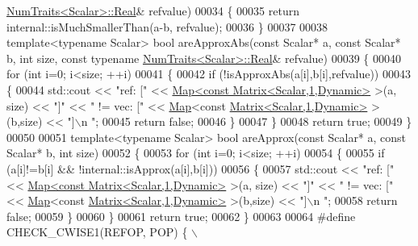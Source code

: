 \begin{DoxyCode}
      \hyperlink{group___core___module_struct_eigen_1_1_num_traits}{NumTraits<Scalar>::Real}& refvalue)
00034 \{
00035   \textcolor{keywordflow}{return} internal::isMuchSmallerThan(a-b, refvalue);
00036 \}
00037 
00038 \textcolor{keyword}{template}<\textcolor{keyword}{typename} Scalar> \textcolor{keywordtype}{bool} areApproxAbs(\textcolor{keyword}{const} Scalar* a, \textcolor{keyword}{const} Scalar* b, \textcolor{keywordtype}{int} size, \textcolor{keyword}{const} \textcolor{keyword}{typename} 
      \hyperlink{group___core___module_struct_eigen_1_1_num_traits}{NumTraits<Scalar>::Real}& refvalue)
00039 \{
00040   \textcolor{keywordflow}{for} (\textcolor{keywordtype}{int} i=0; i<size; ++i)
00041   \{
00042     \textcolor{keywordflow}{if} (!isApproxAbs(a[i],b[i],refvalue))
00043     \{
00044       std::cout << \textcolor{stringliteral}{"ref: ["} << \hyperlink{group___core___module_class_eigen_1_1_map}{Map<const Matrix<Scalar,1,Dynamic>} >(a,
      size) << \textcolor{stringliteral}{"]"} << \textcolor{stringliteral}{" != vec: ["} << \hyperlink{group___core___module_class_eigen_1_1_map}{Map}<\textcolor{keyword}{const} \hyperlink{group___core___module_class_eigen_1_1_matrix}{Matrix<Scalar,1,Dynamic>} >(b,size) << \textcolor{stringliteral}{"]\(\backslash\)n
      "};
00045       \textcolor{keywordflow}{return} \textcolor{keyword}{false};
00046     \}
00047   \}
00048   \textcolor{keywordflow}{return} \textcolor{keyword}{true};
00049 \}
00050 
00051 \textcolor{keyword}{template}<\textcolor{keyword}{typename} Scalar> \textcolor{keywordtype}{bool} areApprox(\textcolor{keyword}{const} Scalar* a, \textcolor{keyword}{const} Scalar* b, \textcolor{keywordtype}{int} size)
00052 \{
00053   \textcolor{keywordflow}{for} (\textcolor{keywordtype}{int} i=0; i<size; ++i)
00054   \{
00055     \textcolor{keywordflow}{if} (a[i]!=b[i] && !internal::isApprox(a[i],b[i]))
00056     \{
00057       std::cout << \textcolor{stringliteral}{"ref: ["} << \hyperlink{group___core___module_class_eigen_1_1_map}{Map<const Matrix<Scalar,1,Dynamic>} >(a,
      size) << \textcolor{stringliteral}{"]"} << \textcolor{stringliteral}{" != vec: ["} << \hyperlink{group___core___module_class_eigen_1_1_map}{Map}<\textcolor{keyword}{const} \hyperlink{group___core___module_class_eigen_1_1_matrix}{Matrix<Scalar,1,Dynamic>} >(b,size) << \textcolor{stringliteral}{"]\(\backslash\)n
      "};
00058       \textcolor{keywordflow}{return} \textcolor{keyword}{false};
00059     \}
00060   \}
00061   \textcolor{keywordflow}{return} \textcolor{keyword}{true};
00062 \}
00063 
00064 \textcolor{preprocessor}{#define CHECK\_CWISE1(REFOP, POP) \{ \(\backslash\)}

\end{DoxyCode}
